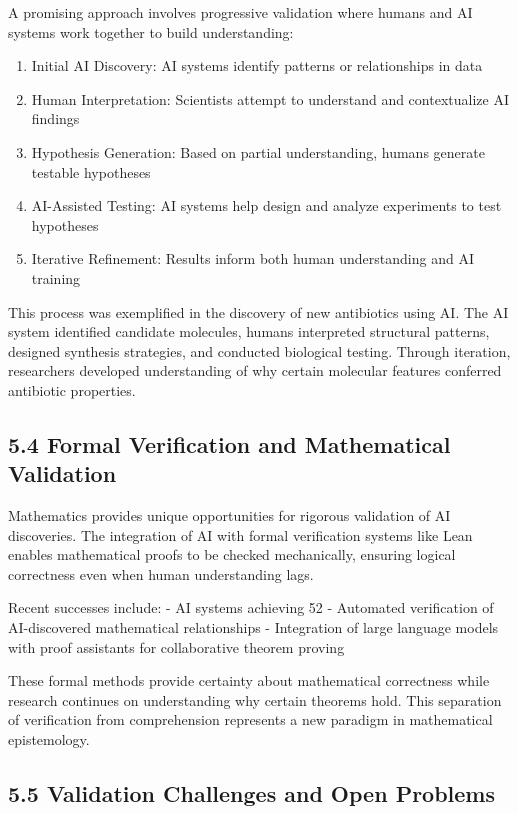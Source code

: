 \documentclass{article}
\begin{document}
A promising approach involves progressive validation where humans and AI systems work together to build understanding:


\begin{enumerate}
  \item Initial AI Discovery: AI systems identify patterns or relationships in data
  \item Human Interpretation: Scientists attempt to understand and contextualize AI findings
  \item Hypothesis Generation: Based on partial understanding, humans generate testable hypotheses
  \item AI-Assisted Testing: AI systems help design and analyze experiments to test hypotheses
  \item Iterative Refinement: Results inform both human understanding and AI training
\end{enumerate}

This process was exemplified in the discovery of new antibiotics using AI. The AI system identified candidate molecules, humans interpreted structural patterns, designed synthesis strategies, and conducted biological testing. Through iteration, researchers developed understanding of why certain molecular features conferred antibiotic properties.


\subsection{5.4 Formal Verification and Mathematical Validation}

Mathematics provides unique opportunities for rigorous validation of AI discoveries. The integration of AI with formal verification systems like Lean enables mathematical proofs to be checked mechanically, ensuring logical correctness even when human understanding lags.


Recent successes include:
- AI systems achieving 52%
- Automated verification of AI-discovered mathematical relationships
- Integration of large language models with proof assistants for collaborative theorem proving


These formal methods provide certainty about mathematical correctness while research continues on understanding why certain theorems hold. This separation of verification from comprehension represents a new paradigm in mathematical epistemology.


\subsection{5.5 Validation Challenges and Open Problems}
\end{document}
